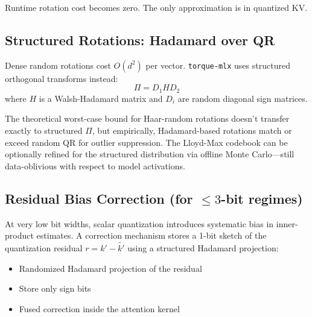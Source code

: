 \documentclass[nobib]{tufte-handout}
\begin{document}
Runtime rotation cost becomes zero. The only approximation is in quantized KV.


\subsection{Structured Rotations: Hadamard over QR}

Dense random rotations cost $O(d^2)$ per vector. \texttt{torque-mlx} uses structured orthogonal transforms instead:
\[
  \Pi = D_1 H D_2
\]
where $H$ is a Walsh-Hadamard matrix and $D_i$ are random diagonal sign matrices.


The theoretical worst-case bound for Haar-random rotations doesn't transfer exactly to structured $\Pi$, but empirically, Hadamard-based rotations match or exceed random QR for outlier suppression. The Lloyd-Max codebook can be optionally refined for the structured distribution via offline Monte Carlo---still data-oblivious with respect to model activations.


\subsection{Residual Bias Correction (for $\le 3$-bit regimes)}

At very low bit widths, scalar quantization introduces systematic bias in inner-product estimates. A correction mechanism stores a 1-bit sketch of the quantization residual $r = k' - \tilde{k'}$ using a structured Hadamard projection:
\begin{itemize}
  \item Randomized Hadamard projection of the residual
  \item Store only sign bits
  \item Fused correction inside the attention kernel
\end{itemize}
\end{document}
